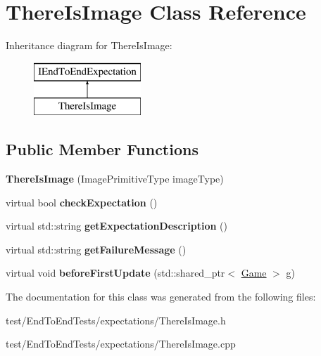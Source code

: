 \hypertarget{classThereIsImage}{}\section{There\+Is\+Image Class Reference}
\label{classThereIsImage}
Inheritance diagram for There\+Is\+Image\+:\begin{figure}[H]
\begin{center}
\leavevmode
\includegraphics[height=2.000000cm]{classThereIsImage}
\end{center}
\end{figure}
\subsection*{Public Member Functions}
\begin{DoxyCompactItemize}
\item 
{\bfseries There\+Is\+Image} (Image\+Primitive\+Type image\+Type)\hypertarget{classThereIsImage_a404fc1a041d0256375bfa0d3724a9a56}{}\label{classThereIsImage_a404fc1a041d0256375bfa0d3724a9a56}

\item 
virtual bool {\bfseries check\+Expectation} ()\hypertarget{classThereIsImage_a9ccb3fa004475fed629ecbf29ef4319b}{}\label{classThereIsImage_a9ccb3fa004475fed629ecbf29ef4319b}

\item 
virtual std\+::string {\bfseries get\+Expectation\+Description} ()\hypertarget{classThereIsImage_a72feb4a2b2b84236cad0f7cf6965f138}{}\label{classThereIsImage_a72feb4a2b2b84236cad0f7cf6965f138}

\item 
virtual std\+::string {\bfseries get\+Failure\+Message} ()\hypertarget{classThereIsImage_aa106403a781e68cfc05013c5432130a3}{}\label{classThereIsImage_aa106403a781e68cfc05013c5432130a3}

\item 
virtual void {\bfseries before\+First\+Update} (std\+::shared\+\_\+ptr$<$ \hyperlink{classGame}{Game} $>$ g)\hypertarget{classThereIsImage_a27dfd45ff788a875e1613bf6b6376351}{}\label{classThereIsImage_a27dfd45ff788a875e1613bf6b6376351}

\end{DoxyCompactItemize}


The documentation for this class was generated from the following files\+:\begin{DoxyCompactItemize}
\item 
test/\+End\+To\+End\+Tests/expectations/There\+Is\+Image.\+h\item 
test/\+End\+To\+End\+Tests/expectations/There\+Is\+Image.\+cpp\end{DoxyCompactItemize}
